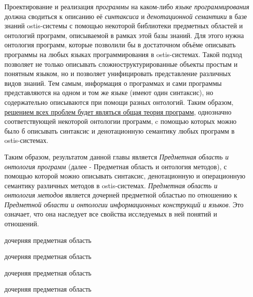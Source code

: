 Проектирование и реализация \textit{программы} на каком-либо \textit{языке программирования} должна сводиться к описанию её \textit{синтаксиса} и \textit{денотационной семантики} в базе знаний ostis-системы с помощью некоторой библиотеки предметных областей и онтологий программ, описываемой в рамках этой базы знаний. Для этого нужна онтология программ, которые позволили бы в достаточном объёме описывать программы на любых языках программирования в ostis-системах. Такой подход позволяет не только описывать сложноструктурированные объекты простым и понятным языком, но и позволяет унифицировать представление различных видов знаний. Тем самым, информация о программах и сами программы представляются на одном и том же языке (имеют один синтаксис), но содержательно описываются при помощи разных онтологий. Таким образом, \uline{решением всех проблем будет являться общая теория программ}, однозначно соответствующей некоторой онтологии программ, c помощью которых можно было б описывать синтаксис и денотационную семантику любых программ в ostis-системах.

Таким образом, результатом данной главы является \textit{Предметная область и онтология программ} (далее - Предметная область и онтология методов), с помощью которой можно описывать синтаксис, денотационную и операционную семантику различных методов в ostis-системах. \textit{Предметная область и онтология методов} является дочерней предметной областью по отношению к \textit{Предметной области и онтологии информационных конструкций и языков}. Это означает, что она наследует все свойства исследуемых в ней понятий и отношений.

\begin{SCn}
\begin{scnrelfromlist}{дочерняя предметная область}
    \begin{scnindent}
        \begin{scnrelfromlist}{дочерняя предметная область}
        \end{scnrelfromlist}
    \end{scnindent}
\end{scnrelfromlist}
\end{SCn}

\begin{SCn}
\begin{scnrelfromlist}{дочерняя предметная область}
    \begin{scnindent}
        \begin{scnrelfromlist}{дочерняя предметная область}
        \end{scnrelfromlist}
    \end{scnindent}
\end{scnrelfromlist}
\end{SCn}

